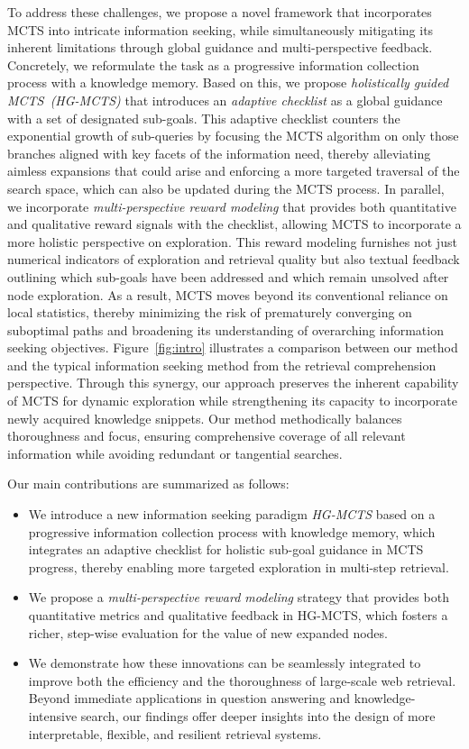 To address these challenges, we propose a novel framework that incorporates MCTS into intricate information seeking, while simultaneously mitigating its inherent limitations through global guidance and multi-perspective feedback. 
Concretely, we reformulate the task as a progressive information collection process with a knowledge memory. Based on this, we propose \emph{holistically guided MCTS~(HG-MCTS)} that introduces an \emph{adaptive checklist} as a global guidance with a set of designated sub-goals.
This adaptive checklist counters the exponential growth of sub-queries by focusing the MCTS algorithm on only those branches aligned with key facets of the information need, thereby alleviating aimless expansions that could arise and enforcing a more targeted traversal of the search space, which can also be updated during the MCTS process. In parallel, we incorporate \emph{multi-perspective reward modeling} that provides both quantitative and qualitative reward signals with the checklist, allowing MCTS to incorporate a more holistic perspective on exploration. This reward modeling furnishes not just numerical indicators of exploration and retrieval quality but also textual feedback outlining which sub-goals have been addressed and which remain unsolved after node exploration. As a result, MCTS moves beyond its conventional reliance on local statistics, thereby minimizing the risk of prematurely converging on suboptimal paths and broadening its understanding of overarching information seeking objectives. Figure~\ref{fig:intro} illustrates a comparison between our method and the typical information seeking method from the retrieval comprehension perspective. 
Through this synergy, our approach preserves the inherent capability of MCTS for dynamic exploration while strengthening its capacity to incorporate newly acquired knowledge snippets. Our method methodically balances thoroughness and focus, ensuring comprehensive coverage of all relevant information while avoiding redundant or tangential searches. 


Our main contributions are summarized as follows:
\begin{itemize}
    \item We introduce a new information seeking paradigm \emph{HG-MCTS} based on a progressive information collection process with knowledge memory, which integrates an adaptive checklist for holistic sub-goal guidance in MCTS progress, thereby enabling more targeted exploration in multi-step retrieval.
    \item We propose a \emph{multi-perspective reward modeling} strategy that provides both quantitative metrics and qualitative feedback in HG-MCTS, which fosters a richer, step-wise evaluation for the value of new expanded nodes.
    \item We demonstrate how these innovations can be seamlessly integrated to improve both the efficiency and the thoroughness of large-scale web retrieval. Beyond immediate applications in question answering and knowledge-intensive search, our findings offer deeper insights into the design of more interpretable, flexible, and resilient retrieval systems.
\end{itemize}
